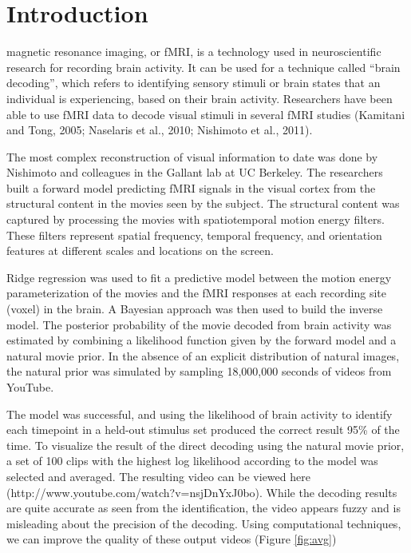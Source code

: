 
\section{Introduction}
 magnetic resonance imaging, or fMRI, is a technology used in neuroscientific research for recording brain activity. It can be used for a technique called ``brain decoding'', which refers to identifying sensory stimuli or brain states that an individual is experiencing, based on their brain activity. Researchers have been able to use fMRI data to decode visual stimuli in several fMRI studies (Kamitani and Tong, 2005; Naselaris et al., 2010; Nishimoto et al., 2011).

The most complex reconstruction of visual information to date was done by Nishimoto and colleagues in the Gallant lab at UC Berkeley. The researchers built a forward model predicting fMRI signals in the visual cortex from the structural content in the movies seen by the subject. The structural content was captured by processing the movies with spatiotemporal motion energy filters. These filters represent spatial frequency, temporal frequency, and orientation features at different scales and locations on the screen. 

Ridge regression was used to fit a predictive model between the motion energy parameterization of the movies and the fMRI responses at each recording site (voxel) in the brain. A Bayesian approach was then used to build the inverse model. The posterior probability of the movie decoded from brain activity was estimated by combining a likelihood function given by the forward model and a natural movie prior. In the absence of an explicit distribution of natural images, the natural prior was simulated by sampling 18,000,000 seconds of videos from YouTube.

The model was successful, and using the likelihood of brain activity to identify each timepoint in a held-out stimulus set produced the correct result 95\% of the time. To visualize the result of the direct decoding using the natural movie prior, a set of 100 clips with the highest log likelihood according to the model was selected and averaged. The resulting video can be viewed here (http://www.youtube.com/watch?v=nsjDnYxJ0bo). While the decoding results are quite accurate as seen from the identification, the video appears fuzzy and is misleading about the precision of the decoding. Using computational techniques, we can improve the quality of these output videos (Figure \ref{fig:avg})


